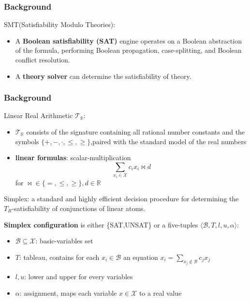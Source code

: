 \documentclass[aspectratio=169%
,serif,mathserif]{beamer}
\begin{document}
\begin{frame}
	\frametitle{Background}
	SMT(Satisfiability Modulo Theories):
	\begin{itemize}
		\item A \textbf{Boolean satisfiability (SAT)} engine operates on a Boolean abstraction of the
		formula, performing Boolean propagation, case-splitting, and Boolean conflict
		resolution.
		\item A \textbf{theory solver} can determine the satisfiability of theory.

		
	\end{itemize}
	
\end{frame}

\begin{frame}
	\frametitle{Background}
	Linear Real Arithmetic $\mathcal{T}_{\mathbb{R}}$:
	\begin{itemize}
		\item $\mathcal{T}_{\mathbb{R}}$ consists of the signature containing all rational number constants and the symbols $\{+,-, \cdot, \leq, \geq\}$,paired with the standard model of the real numbers
		\item \textbf{linear formulas}: scalar-multiplication
			\begin{equation}
				\sum_{x_{i} \in \mathcal{X}} c_{i} x_{i} \bowtie d
			\end{equation}
		for $\bowtie\in\{=, \leq, \geq\},d \in \mathbb{R}$
	\end{itemize}	

\end{frame}

\begin{frame}
	Simplex: a standard and highly efficient decision procedure for determining the $T_{R}$-satisfiability of conjunctions of linear atoms.
	\begin{definition}
		\textbf{Simplex configuration} is either \{SAT,UNSAT\} or a five-tuples $\langle\mathcal{B}, T, l, u, \alpha\rangle$:
		\begin{itemize}
			\item $\mathcal{B} \subseteq \mathcal{X}$: basic-variables set
			\item $T$: tableau, contains for each $x_{i} \in \mathcal{B}$ an equation $x_{i}=\sum_{x_{j} \notin \mathcal{B}} c_{j} x_{j}$
			\item $l,u$: lower and upper for every variables
			\item $\alpha$: assignment, maps each variable $x \in \mathcal{X}$ to a real value
		\end{itemize}
	\end{definition}
\end{frame}
\end{document}
